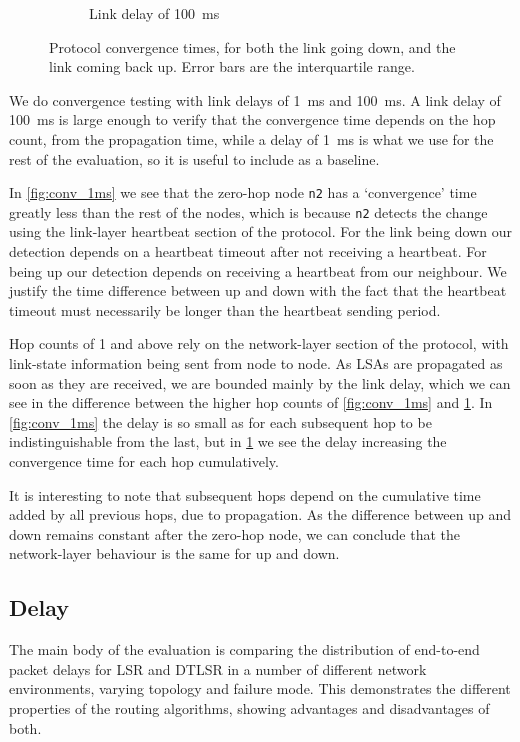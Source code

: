 \documentclass[10pt,twoside,a4paper]{article}
\begin{document}
\begin{figure}[H]
\begin{subfigure}{.5\textwidth}
  \caption{Link delay of \SI{100}{\ms}}
  \label{fig:conv_100ms}
\end{subfigure}
\caption{Protocol convergence times, for both the link going down, and the link coming back up. Error bars are the interquartile range.}
\label{fig:conv}
\end{figure}

We do convergence testing with link delays of \SI{1}{\ms} and \SI{100}{\ms}. A link delay of \SI{100}{\ms} is large enough to verify that the convergence time depends on the hop count, from the propagation time, while a delay of \SI{1}{\ms} is what we use for the rest of the evaluation, so it is useful to include as a baseline.

In \ref{fig:conv_1ms} we see that the zero-hop node \texttt{n2} has a `convergence' time greatly less than the rest of the nodes, which is because \texttt{n2} detects the change using the link-layer heartbeat section of the protocol. For the link being down our detection depends on a heartbeat timeout after not receiving a heartbeat. For being up our detection depends on receiving a heartbeat from our neighbour. We justify the time difference between up and down with the fact that the heartbeat timeout must necessarily be longer than the heartbeat sending period.

Hop counts of 1 and above rely on the network-layer section of the protocol, with link-state information being sent from node to node. As LSAs are propagated as soon as they are received, we are bounded mainly by the link delay, which we can see in the difference between the higher hop counts of \ref{fig:conv_1ms} and \ref{fig:conv_100ms}. In \ref{fig:conv_1ms} the delay is so small as for each subsequent hop to be indistinguishable from the last, but in \ref{fig:conv_100ms} we see the delay increasing the convergence time for each hop cumulatively.

It is interesting to note that subsequent hops depend on the cumulative time added by all previous hops, due to propagation. As the difference between up and down remains constant after the zero-hop node, we can conclude that the network-layer behaviour is the same for up and down.


\subsection{Delay}

The main body of the evaluation is comparing the distribution of end-to-end packet delays for LSR and DTLSR in a number of different network environments, varying topology and failure mode. This demonstrates the different properties of the routing algorithms, showing advantages and disadvantages of both.
\end{document}
